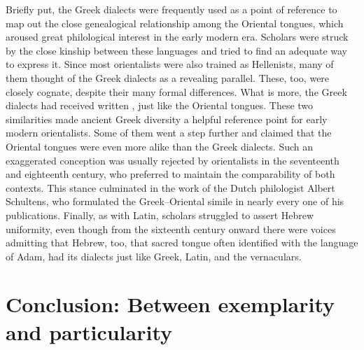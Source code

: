 Briefly put, the Greek dialects were frequently used as a point of reference to map out the close genealogical relationship among the Oriental tongues, which aroused great philological interest in the early modern era. Scholars were struck by the close kinship between these languages and tried to find an adequate way to express it. Since most orientalists were also trained as Hellenists, many of them thought of the Greek dialects as a revealing parallel. These, too, were closely cognate, despite their many formal differences. What is more, the Greek dialects had received written , just like the Oriental tongues. These two similarities made ancient Greek diversity a helpful reference point for early modern orientalists. Some of them went a step further and claimed that the Oriental tongues were even more alike than the Greek dialects. Such an exaggerated conception was usually rejected by orientalists in the seventeenth and eighteenth century, who preferred to maintain the comparability of both contexts. This stance culminated in the work of the Dutch philologist Albert Schultens, who formulated the Greek–Oriental simile in nearly every one of his publications. Finally, as with Latin, scholars struggled to assert Hebrew uniformity, even though from the sixteenth century onward there were voices admitting that Hebrew, too, that sacred tongue often identified with the language of Adam, had its dialects just like Greek, Latin, and the vernaculars.

\section{Conclusion: Between exemplarity and particularity}\label{sec:8.4}

